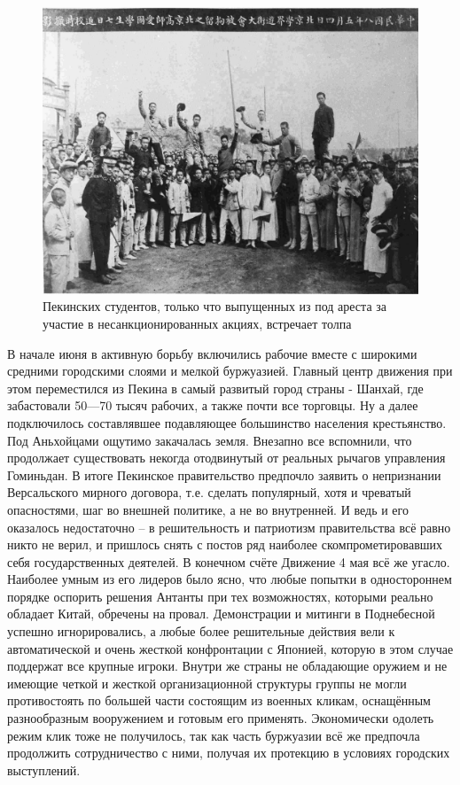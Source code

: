 \begin{figure}[h!tb] 
	\centering\includegraphics[scale=0.2]{Glava6/ZBi7nZhVeqE.jpg}
	\caption{Пекинских студентов, только что выпущенных из под ареста за участие в несанкционированных акциях, встречает толпа}%
\end{figure}

В начале июня в активную борьбу включились рабочие вместе с широкими средними городскими слоями и мелкой буржуазией. Главный центр движения при этом переместился из Пекина в самый развитый город страны - Шанхай, где забастовали 50—70 тысяч рабочих, а также почти все торговцы. Ну а далее подключилось составлявшее подавляющее большинство населения крестьянство. Под Аньхойцами ощутимо закачалась земля. Внезапно все вспомнили, что продолжает существовать некогда отодвинутый от реальных рычагов управления Гоминьдан. В итоге Пекинское правительство предпочло заявить о непризнании Версальского мирного договора, т.е. сделать популярный, хотя и чреватый опасностями, шаг во внешней политике, а не во внутренней. И ведь и его оказалось недостаточно – в решительность и патриотизм правительства всё равно никто не верил, и пришлось снять с постов ряд наиболее скомпрометировавших себя государственных деятелей. В конечном счёте Движение 4 мая всё же угасло. Наиболее умным из его лидеров было ясно, что любые попытки в одностороннем порядке оспорить решения Антанты при тех возможностях, которыми реально обладает Китай, обречены на провал. Демонстрации и митинги в Поднебесной успешно игнорировались, а любые более решительные действия вели к автоматической и очень жесткой конфронтации с Японией, которую в этом случае поддержат все крупные игроки. Внутри же страны не обладающие оружием и не имеющие четкой и жесткой организационной структуры группы не могли противостоять по большей части состоящим из военных кликам, оснащённым разнообразным вооружением и готовым его применять. Экономически одолеть режим клик тоже не получилось, так как часть буржуазии всё же предпочла продолжить сотрудничество с ними, получая их протекцию в условиях городских выступлений.

